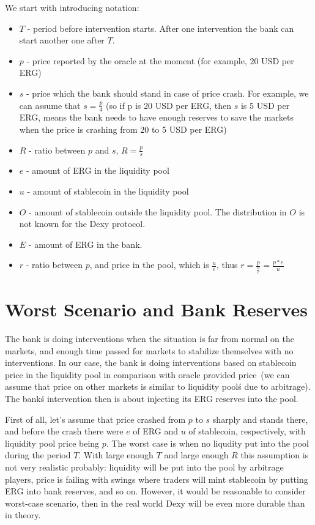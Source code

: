 \documentclass{article}   %
\newcommand{\bc}{ERG}
\newcommand{\stc}{stablecoin}
\newcommand{\sct}{stablecoin}
\newcommand{\dx}{Dexy}
\begin{document}
We start with introducing notation: 
\begin{itemize}
  \item{} $T$ - period before intervention starts. After one intervention the bank can start another one after $T$. 
  \item{} $p$ - price reported by the oracle at the moment (for example, 20 USD per ERG)
  \item{} $s$ - price which the bank should stand in case of price crash. For example, we can assume that $s = \frac{p}{4}$ (so if p is 20 USD per ERG, then $s$ is 5 USD per ERG, means the bank needs to have enough reserves to save the markets when the price is crashing from 20 to 5 USD per ERG)
  \item{} $R$ - ratio between $p$ and $s$, $R = \frac{p}{s}$
  \item{} $e$ - amount of \bc{} in the liquidity pool 
  \item{} $u$ - amount of \stc{} in the liquidity pool
  \item{} $O$ - amount of \stc{} outside the liquidity pool. The distribution in $O$ is not known for the \dx{} protocol.
  \item{} $E$ - amount of \bc{} in the bank. 
  \item{} $r$ - ratio between $p$, and price in the pool, which is $\frac{u}{e}$, thus $r = \frac{p}{\frac{u}{e}} = \frac{p*e}{u}$
\end{itemize}  

\section{Worst Scenario and Bank Reserves}

The bank is doing interventions when the situation is far from normal on the markets, and enough time passed for markets to stabilize themselves with no interventions. In our case, the bank is doing interventions based on stablecoin price in the liquidity pool in comparison with oracle provided price~(we can assume that price on other markets is similar to liquidity pool\'s due to arbitrage). The bank\'s intervention then is about injecting its \bc{} reserves into the pool.  

First of all, let's assume that price crashed from $p$ to $s$ sharply and stands there, and before the crash there were $e$ of \bc{} and $u$ of \sct{}, respectively, with liquidity pool price being $p$. The worst case is when no liqudity put into the pool during the period $T$. With large enough $T$ and large enough $R$ this assumption is not very realistic probably: liquidity will be put into the pool by arbitrage players, price is failing with swings where traders will mint \sct{} by putting \bc{} into bank reserves, and so on. However, it would be reasonable to consider worst-case scenario, then in the real world \dx{} will be even more durable than in theory. 
\end{document}
